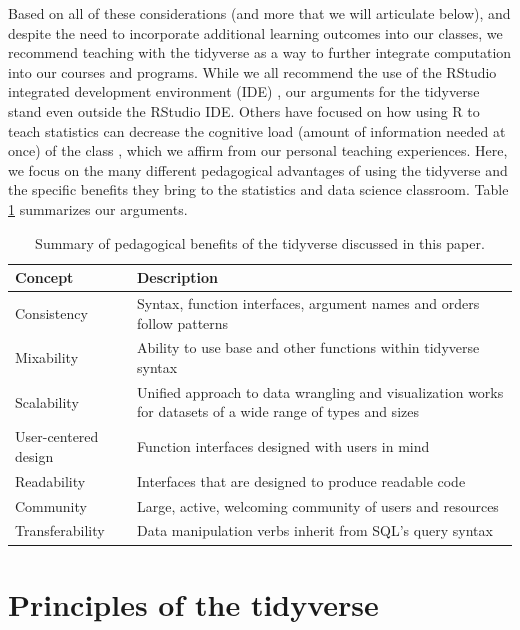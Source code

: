 \documentclass[12pt]{article}
\begin{document}
Based on all of these considerations (and more that we will articulate
below), and despite the need to incorporate additional learning outcomes
into our classes, we recommend teaching with the tidyverse as a way to
further integrate computation into our courses and programs. While we
all recommend the use of the RStudio integrated development environment
(IDE) \citep{rstudio}, our arguments for the tidyverse stand even
outside the RStudio IDE. Others have focused on how using R to teach
statistics can decrease the cognitive load (amount of information needed
at once) of the class
\citep{Pruim2017, guzman2019successful, tuckerstatistics2021}, which we
affirm from our personal teaching experiences. Here, we focus on the
many different pedagogical advantages of using the tidyverse and the
specific benefits they bring to the statistics and data science
classroom. Table \ref{tab:summary} summarizes our arguments.

\linespread{1}
\begin{table}

\caption{\label{tab:tab:summary}Summary of pedagogical benefits of the tidyverse discussed in this paper.\label{tab:summary}}
\centering
\begin{tabular}[t]{l|>{\raggedright\arraybackslash}p{28em}}
\hline
Concept & Description\\
\hline
Consistency & Syntax, function interfaces, argument names and orders follow patterns\\
\hline
Mixability & Ability to use base and other functions within tidyverse syntax\\
\hline
Scalability & Unified approach to data wrangling and visualization works for datasets of a wide range of types and sizes\\
\hline
User-centered design & Function interfaces designed with users in mind\\
\hline
Readability & Interfaces that are designed to produce readable code\\
\hline
Community & Large, active, welcoming community of users and resources\\
\hline
Transferability & Data manipulation verbs inherit from SQL's query syntax\\
\hline
\end{tabular}
\end{table}\linespread{2}
\vspace{3mm}\setlength{\parindent}{15pt}

\hypertarget{sec:principles}{%
\section{Principles of the tidyverse}\label{sec:principles}}
\end{document}
